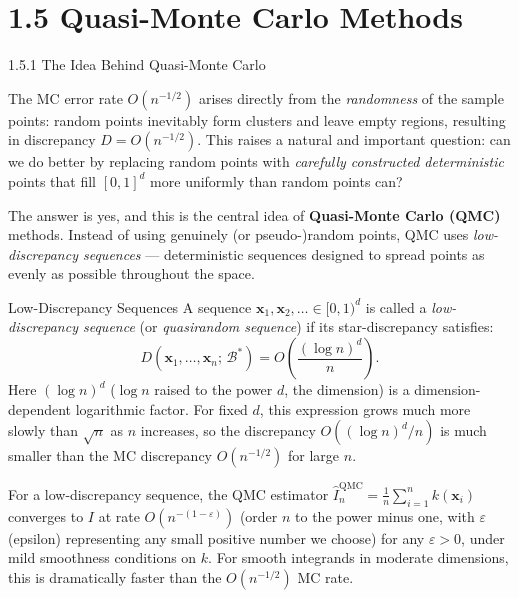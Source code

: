 \documentclass[aspectratio=169,10pt]{beamer}
\begin{document}
\section{1.5 Quasi-Monte Carlo Methods}

\begin{frame}[allowframebreaks]{1.5.1 The Idea Behind Quasi-Monte Carlo}

  The MC error rate $O(n^{-1/2})$ arises directly from the \emph{randomness}
  of the sample points: random points inevitably form clusters and leave empty
  regions, resulting in discrepancy $D = O(n^{-1/2})$.  This raises a natural
  and important question: can we do better by replacing random points with
  \emph{carefully constructed deterministic} points that fill $[0,1]^d$ more
  uniformly than random points can?

  The answer is yes, and this is the central idea of \textbf{Quasi-Monte Carlo
  (QMC)} methods.  Instead of using genuinely (or pseudo-)random points, QMC
  uses \emph{low-discrepancy sequences} --- deterministic sequences designed to
  spread points as evenly as possible throughout the space.

  \begin{block}{Low-Discrepancy Sequences}
    A sequence $\mathbf{x}_1, \mathbf{x}_2, \ldots \in [0,1)^d$ is called a
    \emph{low-discrepancy sequence} (or \emph{quasirandom sequence}) if its
    star-discrepancy satisfies:
    \[
      D(\mathbf{x}_1, \ldots, \mathbf{x}_n;\, \mathcal{B}^*)
      = O\!\left(\frac{(\log n)^d}{n}\right).
    \]
    Here $(\log n)^d$ ($\log n$ raised to the power $d$, the dimension) is a
    dimension-dependent logarithmic factor.  For fixed $d$, this expression
    grows much more slowly than $\sqrt{n}$ as $n$ increases, so the discrepancy
    $O((\log n)^d / n)$ is much smaller than the MC discrepancy $O(n^{-1/2})$
    for large $n$.
  \end{block}

  For a low-discrepancy sequence, the QMC estimator
  $\hat{I}_n^{\mathrm{QMC}} = \frac{1}{n}\sum_{i=1}^n k(\mathbf{x}_i)$
  converges to $I$ at rate $O(n^{-(1-\varepsilon)})$ (order $n$ to the power
  minus one, with $\varepsilon$ (epsilon) representing any small positive number
  we choose) for any $\varepsilon > 0$, under mild smoothness conditions on $k$.
  For smooth integrands in moderate dimensions, this is dramatically faster than
  the $O(n^{-1/2})$ MC rate.


\end{frame}
\end{document}
